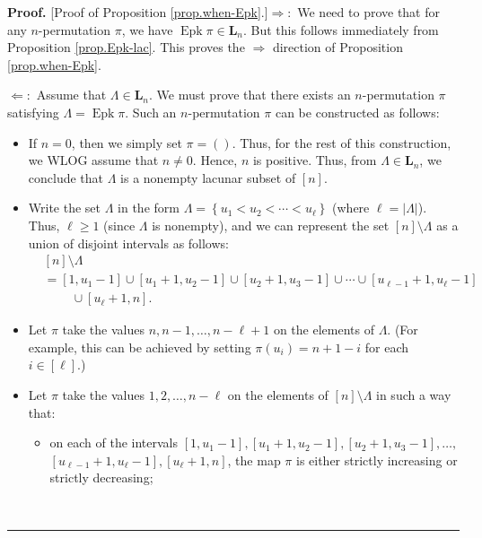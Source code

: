 \documentclass[numbers=enddot,12pt,final,onecolumn,notitlepage]{scrartcl}%
\theoremstyle{definition}
\newenvironment{proof}[1][Proof]{\noindent\textbf{#1.} }{\ \rule{0.5em}{0.5em}}
\newenvironment{verlong}{}{}
\begin{document}
\begin{verlong}
\begin{proof}
[Proof of Proposition \ref{prop.when-Epk}.]$\Longrightarrow:$ We need to prove
that for any $n$-permutation $\pi$, we have $\operatorname{Epk}\pi
\in\mathbf{L}_{n}$. But this follows immediately from Proposition
\ref{prop.Epk-lac}. This proves the $\Longrightarrow$ direction of Proposition
\ref{prop.when-Epk}.

$\Longleftarrow:$ Assume that $\Lambda\in\mathbf{L}_{n}$. We must prove that
there exists an $n$-permutation $\pi$ satisfying
$\Lambda = \operatorname{Epk} \pi$.
Such an $n$-permutation $\pi$ can be constructed as follows:

\begin{itemize}
\item If $n=0$, then we simply set $\pi=\left(  {}\right)  $. Thus, for the
rest of this construction, we WLOG assume that $n\neq0$. Hence, $n$ is
positive. Thus, from $\Lambda\in\mathbf{L}_{n}$, we conclude that $\Lambda$ is
a nonempty lacunar subset of $\left[  n\right]  $.

\item Write the set $\Lambda$ in the form $\Lambda=\left\{  u_{1}<u_{2}%
<\cdots<u_{\ell}\right\}  $ (where $\ell=\left\vert \Lambda\right\vert $).
Thus, $\ell\geq1$ (since $\Lambda$ is nonempty), and we can represent the set
$\left[  n\right]  \setminus\Lambda$ as a union of disjoint intervals as
follows:
\begin{align*}
&  \left[  n\right]  \setminus\Lambda\\
&  =\left[  1,u_{1}-1\right]  \cup\left[  u_{1}+1,u_{2}-1\right]  \cup\left[
u_{2}+1,u_{3}-1\right]  \cup\cdots\cup\left[  u_{\ell-1}+1,u_{\ell}-1\right]
\\
&  \ \ \ \ \ \ \ \ \ \ \cup\left[  u_{\ell}+1,n\right]  .
\end{align*}


\item Let $\pi$ take the values $n,n-1,\ldots,n-\ell+1$ on the elements of
$\Lambda$. (For example, this can be achieved by setting $\pi\left(
u_{i}\right)  =n+1-i$ for each $i\in\left[  \ell\right]  $.)

\item Let $\pi$ take the values $1,2,\ldots,n-\ell$ on the elements of
$\left[  n\right]  \setminus\Lambda$ in such a way that:

\begin{itemize}
\item[(A)] on each of the intervals $\left[  1,u_{1}-1\right]  ,\left[
u_{1}+1,u_{2}-1\right]  ,\left[  u_{2}+1,u_{3}-1\right]  ,\ldots,$%
\newline$\left[  u_{\ell-1}+1,u_{\ell}-1\right]  ,\left[  u_{\ell}+1,n\right]
$, the map $\pi$ is either strictly increasing or strictly decreasing;


\end{itemize}
\end{itemize}
\end{proof}
\end{verlong}
\end{document}
